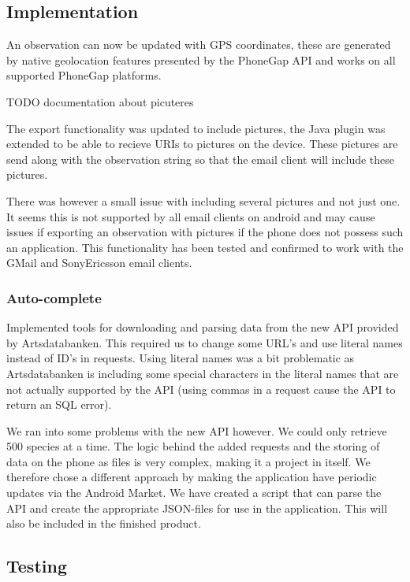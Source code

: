 \subsection{Implementation}
An observation can now be updated with GPS coordinates, these are generated by native geolocation features presented by the PhoneGap API and works on all supported PhoneGap platforms.

TODO documentation about picuteres

The export functionality was updated to include pictures, the Java plugin was extended to be able to recieve URIs to pictures on the device.
These pictures are send along with the observation string so that the email client will include these pictures.

There was however a small issue with including several pictures and not just one.
It seems this is not supported by all email clients on android and may cause issues if exporting an observation with pictures if the phone does not possess such an application.
This functionality has been tested and confirmed to work with the GMail and SonyEricsson email clients.

	\subsubsection{Auto-complete}

	Implemented tools for downloading and parsing data from the new API
	provided by Artsdatabanken. This required us to change some URL's and use
	literal names instead of ID's in requests. Using literal names was a bit
	problematic as Artsdatabanken is including some special characters in the
	literal names that are not actually supported by the API (using commas in a
	request cause the API to return an SQL error).

  We ran into some problems with the new API however. We could only retrieve 500 species at a time. The logic behind the added requests and the storing of data on the phone as files is very complex, making it a project in itself. We therefore chose a different approach by making the application have periodic updates via the Android Market. We have created a script that can parse the API and create the appropriate JSON-files for use in the application. This will also be included in the finished product. 

\subsection{Testing}


